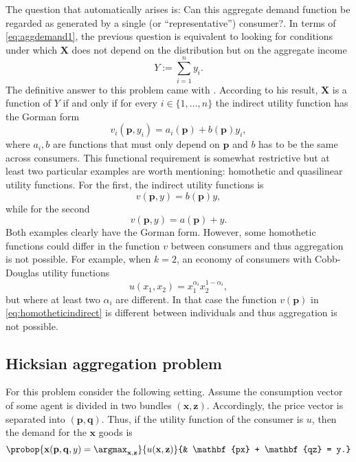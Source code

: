\documentclass[english, a4paper,12pt]{article}
\begin{document}
The question that automatically arises is: Can this aggregate demand function be regarded as generated by a single (or ``representative'') consumer?. In terms of \cref{eq:aggdemand1}, the previous question is equivalent to looking for conditions under which $\mathbf{X}$ does not depend on the distribution but on the aggregate income
	$$Y := \sum_{i=1}^{n} y_{i}.$$
The definitive answer to this problem came with \cite{Gorman53}. According to his result, $\mathbf{X}$ is a function of $Y$ if and only if for every $i \in \{1,\ldots,n\}$ the indirect utility function has the Gorman form
	$$v_{i}(\mathbf{p}, y_{i}) = a_{i}(\mathbf{p}) + b(\mathbf{p})y_{i},$$ 
where $a_{i}, b$ are functions that must only depend on $\mathbf{p}$ and $b$ has to be the same across consumers. This functional requirement is somewhat restrictive but at least two particular examples are worth mentioning: homothetic and quasilinear utility functions. For the first, the indirect utility functions is
	\begin{equation} \label{eq:homotheticindirect}
		v(\mathbf{p}, y) = b(\mathbf{p})y,
	\end{equation}
while for the second
	$$v(\mathbf{p}, y) = a(\mathbf{p}) + y.$$
Both examples clearly have the Gorman form. However, some homothetic functions could differ in the function $v$ between consumers and thus aggregation is not possible. For example, when $k = 2$, an economy of consumers with Cobb-Douglas utility functions
	$$u(x_{1}, x_{2}) = x_{1}^{\alpha_{i}}x_{2}^{1-\alpha_{i}},$$
but where at least two $\alpha_{i}$ are different. In that case the function $v(\mathbf{p})$ in \eqref{eq:homotheticindirect} is different between individuals and thus aggregation is not possible.

\subsection{Hicksian aggregation problem} \label{ssec:HicksAgg}
For this problem consider the following setting. Assume the consumption vector of some agent is divided in two bundles $(\mathbf{x}, \mathbf{z})$. Accordingly, the price vector is separated into $(\mathbf{p}, \mathbf{q})$. Thus, if the utility function of the consumer is $u$, then the demand for the $\mathbf{x}$ goods is
	\begin{equation} \label{eq:hickdisprob}
		\probop{\mathbf{x}(\mathbf{p}, \mathbf{q}, y) = \argmax_{\mathbf{x}, \mathbf{z}}}{u(\mathbf{x}, \mathbf{z})}
					{&	\mathbf{px} + \mathbf{qz} = y.}
	\end{equation}
\end{document}
